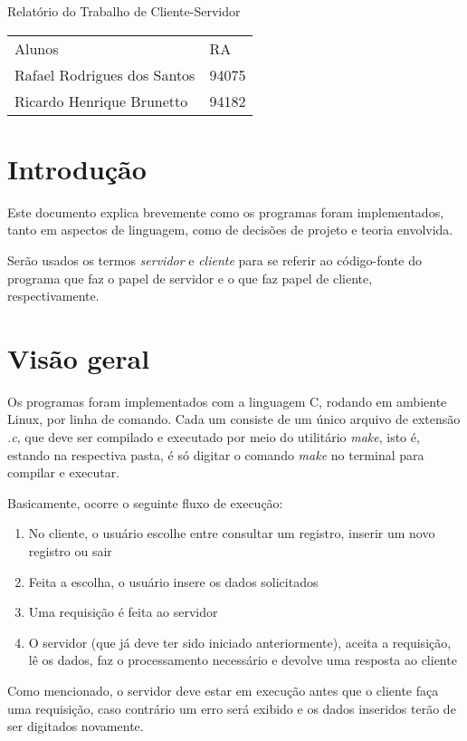 \documentclass[12pt]{article}
\begin{document}
\begin{center}
\LARGE Relatório do Trabalho de Cliente-Servidor
\end{center}

\begin{tabular}{p{15cm}l}
Alunos & RA \\
Rafael Rodrigues dos Santos & 94075 \\

Ricardo Henrique Brunetto & 94182
\end{tabular}

\section{Introdução}

Este documento explica brevemente como os programas foram implementados, tanto em aspectos de linguagem, como de decisões de projeto e teoria envolvida.

Serão usados os termos \emph{servidor} e \emph{cliente} para se referir ao código-fonte do programa que faz o papel de servidor e o que faz papel de cliente, respectivamente.

\section{Visão geral}

Os programas foram implementados com a linguagem C, rodando em ambiente Linux, por linha de comando. Cada um consiste de um único arquivo de extensão \emph{.c}, que deve ser compilado e executado por meio do utilitário \emph{make}, isto é, estando na respectiva pasta, é só digitar o comando \emph{make} no terminal para compilar e executar.

Basicamente, ocorre o seguinte fluxo de execução:

\begin{enumerate}
\item No cliente, o usuário escolhe entre consultar um registro, inserir um novo registro ou sair
\item Feita a escolha, o usuário insere os dados solicitados
\item Uma requisição é feita ao servidor
\item O servidor (que já deve ter sido iniciado anteriormente), aceita a requisição, lê os dados, faz o processamento necessário e devolve uma resposta ao cliente
\end{enumerate}

Como mencionado, o servidor deve estar em execução antes que o cliente faça uma requisição, caso contrário um erro será exibido e os dados inseridos terão de ser digitados novamente.
\end{document}
